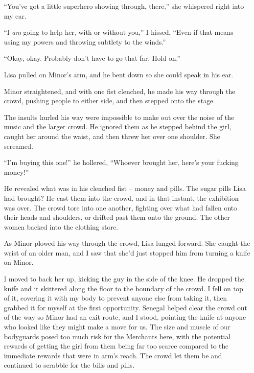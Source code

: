 ``You've got a little superhero showing through, there,'' she whispered right into my ear.



``I \emph{am} going to help her, with or without you,'' I hissed, ``Even if that means using my powers and throwing subtlety to the winds.''



``Okay, okay.  Probably don't have to go that far.  Hold on.''



Lisa pulled on Minor's arm, and he bent down so she could speak in his ear.



Minor straightened, and with one fist clenched, he made his way through the crowd, pushing people to either side, and then stepped onto the stage.



The insults hurled his way were impossible to make out over the noise of the music and the larger crowd.  He ignored them as he stepped behind the girl, caught her around the waist, and then threw her over one shoulder.  She screamed.



``I'm buying this one!'' he hollered, ``Whoever brought her, here's your fucking money!''



He revealed what was in his clenched fist – money and pills.  The sugar pills Lisa had brought?  He cast them into the crowd, and in that instant, the exhibition was over.  The crowd tore into one another, fighting over what had fallen onto their heads and shoulders, or drifted past them onto the ground.  The other women backed into the clothing store.



As Minor plowed his way through the crowd, Lisa lunged forward.  She caught the wrist of an older man, and I saw that she'd just stopped him from turning a knife on Minor.



I moved to back her up, kicking the guy in the side of the knee.  He dropped the knife and it skittered along the floor to the boundary of the crowd.  I fell on top of it, covering it with my body to prevent anyone else from taking it, then grabbed it for myself at the first opportunity.  Senegal helped clear the crowd out of the way so Minor had an exit route, and I stood, pointing the knife at anyone who looked like they might make a move for us.  The size and muscle of our bodyguards posed too much risk for the Merchants here, with the potential rewards of getting the girl from them being far too scarce compared to the immediate rewards that were in arm's reach.  The crowd let them be and continued to scrabble for the bills and pills.



